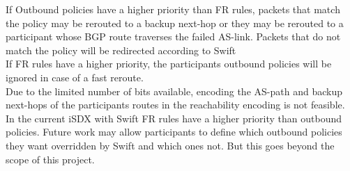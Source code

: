 If Outbound policies have a higher priority than FR rules, packets that match the policy may be rerouted to a backup next-hop or they may be rerouted to a participant whose BGP route traverses the failed AS-link. Packets that do not match the policy will be redirected according to Swift\\
If FR rules have a higher priority, the participants outbound policies will be ignored in case of a fast reroute. \\
Due to the limited number of bits available, encoding the AS-path and backup next-hops of the participants routes in the reachability encoding is not feasible. In the current iSDX with Swift FR rules have a higher priority than outbound policies. Future work may allow participants to define which outbound policies they want overridden by Swift and which ones not. But this goes beyond the scope of this project.

